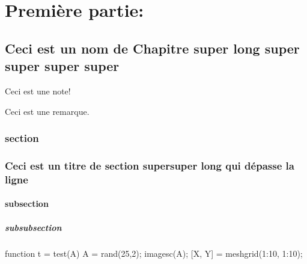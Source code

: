 \documentclass[11pt,table]{book}
\begin{document}


\tableofcontents

\newpage
\begin{figure}
 \centering
\EANisbn
\end{figure} 
 
\newpage
\part{Premi\`ere partie: \matlabregistered}
\def\difficulty{3} 
\chapter[Chapitre super long]{Ceci est un nom de Chapitre super long super super super super} 

\begin{note}Ceci est une note!\end{note}

\begin{rmq} 
 Ceci est une remarque.
\end{rmq}




\newpage
{}

\section{section}
\section{Ceci est un titre de section supersuper long qui dépasse la ligne}
\subsection{subsection}
\subsubsection{subsubsection}

\begin{matlab}
function t = test(A)
A = rand(25,2);
imagesc(A);
[X, Y] = meshgrid(1:10, 1:10);
\end{matlab}
\end{document}
